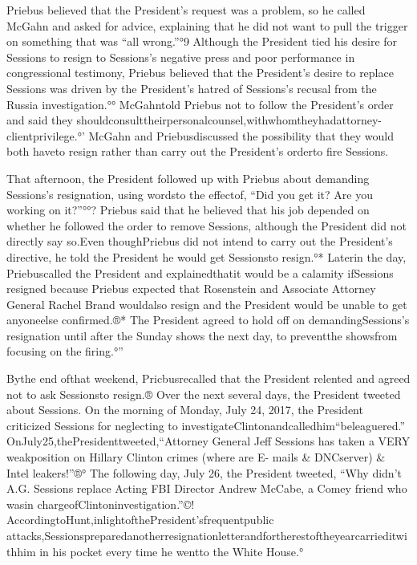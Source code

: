 {Priebus believed that the President’s request was a problem, so he called McGahn and asked for advice, explaining that he did not want to pull the trigger on something that was “all wrong.”°9
Although the President tied his desire for Sessions to resign to Sessions’s negative press and poor performance in congressional testimony, Priebus believed that the President’s desire to replace Sessions was driven by the President’s hatred of Sessions’s recusal from the Russia investigation.°°
McGahntold Priebus not to follow the President’s order and said they shouldconsulttheirpersonalcounsel,withwhomtheyhadattorney-clientprivilege.°'
McGahn and Priebusdiscussed the possibility that they would both haveto resign rather than carry out the President’s orderto fire Sessions.

That afternoon, the President followed up with Priebus about demanding Sessions’s resignation, using wordsto the effectof, “Did you get it?
Are you working on it?”°°?
Priebus said that he believed that his job depended on whether he followed the order to remove Sessions, although the President did not directly say so.Even thoughPriebus did not intend to carry out the President’s directive, he told the President he would get Sessionsto resign.°*
Laterin the day, Priebuscalled the President and explainedthatit would be a calamity ifSessions resigned because Priebus expected that Rosenstein and Associate Attorney General Rachel Brand wouldalso resign and the President would be unable to get anyoneelse confirmed.®*
The President agreed to hold off on demandingSessions’s resignation until after the Sunday shows the next day, to preventthe showsfrom focusing on the firing.°”

Bythe end ofthat weekend, Pricbusrecalled that the President relented and agreed not to ask Sessionsto resign.®
Over the next several days, the President tweeted about Sessions.
On the morning of Monday, July 24, 2017, the President criticized Sessions for neglecting to investigateClintonandcalledhim“beleaguered.”
OnJuly25,thePresidenttweeted,“Attorney General Jeff Sessions has taken a VERY weakposition on Hillary Clinton crimes (where are E- mails & DNCserver) & Intel leakers!”®°
The following day, July 26, the President tweeted, “Why didn’t A.G. Sessions replace Acting FBI Director Andrew McCabe, a Comey friend who wasin chargeofClintoninvestigation.”©!
AccordingtoHunt,inlightofthePresident’sfrequentpublic attacks,Sessionspreparedanotherresignationletterandfortherestoftheyearcarrieditwithhim in his pocket every time he wentto the White House.°

}
